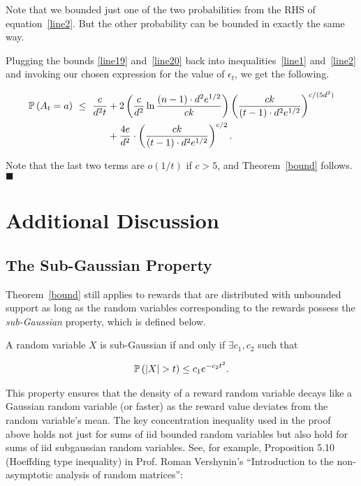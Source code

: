 \documentclass[11pt]{article}
\begin{document}
Note that we bounded just one of the two probabilities from the RHS of equation~\eqref{line2}. But the other probability can be bounded in exactly the same way.

Plugging the bounds \eqref{line19} and~\eqref{line20} back into inequalities~\eqref{line1} and~\eqref{line2} and invoking our chosen expression for the value of $\epsilon_t$, we get the following.

\begin{align}
 \mathbb{P}\left( A_t = a \right)\ \leq\ \frac{c}{d^2 t} &+ 2 \left( \frac{c}{d^2} \ln \frac{(n - 1) \cdot d^2 e^{1/2}}{ck} \right) \left( \frac{ck}{(t - 1) \cdot d^2 e^{1/2}} \right)^{c/(5d^2)}\\ 
 &+ \frac{4e}{d^2} \cdot \left(  \frac{ck}{(t - 1) \cdot d^2 e^{1/2}} \right)^{c/2} \textnormal{.}
\end{align}

Note that the last two terms are $o(1/t)$ if $c > 5$, and Theorem~\ref{bound} follows. \hfill $\blacksquare$ \\

\section{Additional Discussion}

\subsection{The Sub-Gaussian Property}
Theorem~\ref{bound} still applies to rewards that are distributed with unbounded support as long as the random variables corresponding to the rewards possess the \textit{sub-Gaussian} property, which is defined below.

\begin{definition}
A random variable $X$ is sub-Gaussian if and only if $\exists c_1, c_2$ such that

\begin{align*}
\mathbb{P}\left( \left| X \right| > t \right) \leq c_1 e^{-c_2 t^2} \textnormal{.}
\end{align*}
\end{definition}

This property ensures that the density of a reward random variable decays like a Gaussian random variable (or faster) as the reward value deviates from the random variable's mean. The key concentration inequality used in the proof above
holds not just for sums of iid bounded random variables but also hold for sums of iid subgaussian random variables. See, for example, Proposition 5.10 (Hoeffding type inequality) in
Prof. Roman Vershynin's ``Introduction to the non-asymptotic analysis of random matrices'':
\end{document}
